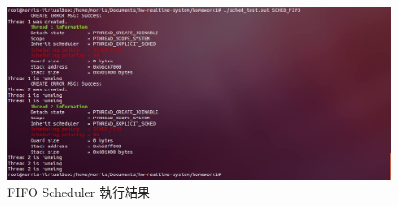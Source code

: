 \documentclass{res}
\begin{document}
\begin{resume}
\begin{figure}[htp]
    \begin{center}
        \includegraphics[width=400pt]{images/result2.jpg}
        \caption{FIFO Scheduler 執行結果}
        \label{fig: result}
    \end{center}
\end{figure}

\end{resume}
\end{document}
